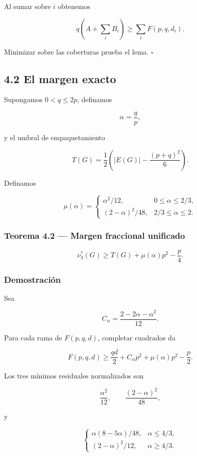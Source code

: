 \documentclass[
  spanish,
  11pt,
  a4paper,
]{article}
\begin{document}
Al sumar sobre \(i\) obtenemos

\[
q\left(A+\sum_iB_i\right)
\ge
\sum_iF(p,q,d_i).
\]

Minimizar sobre las coberturas prueba el lema. \(\square\)

\subsection{4.2 El margen exacto}\label{el-margen-exacto}

Supongamos \(0<q\le2p\), definamos

\[
\alpha=\frac qp,
\]

y el umbral de empaquetamiento

\[
T(G)=\frac12\left(|E(G)|-\frac{(p+q)^2}{6}\right).
\tag{4.2}
\]

Definamos

\[
\mu(\alpha)
=
\begin{cases}
\alpha^2/12,&0\le\alpha\le2/3,\\
(2-\alpha)^2/48,&2/3\le\alpha\le2.
\end{cases}
\tag{4.3}
\]

\subsubsection{Teorema 4.2 --- Margen fraccional unificado}\label{teorema-4.2-margen-fraccional-unificado}

\[
\boxed{
\nu_3^*(G)
\ge
T(G)+\mu(\alpha)p^2-\frac p4.
}
\tag{4.4}
\]

\subsubsection{Demostración}\label{demostraciuxf3n-2}

Sea

\[
C_\alpha=\frac{2-2\alpha-\alpha^2}{12}.
\]

Para cada rama de \(F(p,q,d)\), completar cuadrados da

\[
F(p,q,d)
\ge
\frac{qd}{2}+C_\alpha p^2+\mu(\alpha)p^2-\frac p2.
\tag{4.5}
\]

Los tres mínimos residuales normalizados son

\[
\frac{\alpha^2}{12},
\qquad
\frac{(2-\alpha)^2}{48},
\]

y

\[
\begin{cases}
\alpha(8-5\alpha)/48,&\alpha\le4/3,\\
(2-\alpha)^2/12,&\alpha\ge4/3.
\end{cases}
\]
\end{document}
